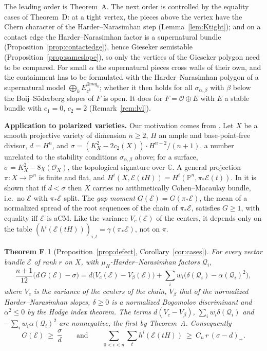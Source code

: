 \documentclass[11pt]{amsart}
\newtheorem*{theoremF}{Theorem F}
\theoremstyle{definition}
\theoremstyle{remark}
\newcommand{\PP}{\mathbb{P}}
\newcommand{\OO}{\mathcal{O}}
\newcommand{\cE}{\mathcal{E}}
\newcommand{\cQ}{\mathcal{Q}}
\begin{document}
The leading order is Theorem~A. The next order is controlled by the equality cases of Theorem~D: at a tight vertex, the pieces above the vertex have the Chern character of the Harder--Narasimhan step (Lemma~\ref{lem:Ktight}); and on a contact edge the Harder--Narasimhan factor is a supernatural bundle (Proposition~\ref{prop:contactedge}), hence Gieseker semistable (Proposition~\ref{prop:sameslope}), so only the vertices of the Gieseker polygon need to be compared. For small $\alpha$ the supernatural pieces cross walls of their own, and the containment has to be formulated with the Harder--Narasimhan polygon of a supernatural model $\bigoplus_kE_{z^k}^{\oplus mq_k}$; whether it then holds for all $\sigma_{\alpha,\beta}$ with $\beta$ below the Boij--Söderberg slopes of $F$ is open. It does for $F=\OO\oplus E$ with $E$ a stable bundle with $c_1=0$, $c_2=2$ (Remark~\ref{rem:lvl}).

\medskip\noindent\textbf{Application to polarized varieties.}
Our motivation comes from \cite{An1,An2}. Let $X$ be a smooth projective variety of dimension $n\ge2$, $H$ an ample and base-point-free divisor, $d=H^n$, and $\sigma=(K_X^2-2c_2(X))\cdot H^{n-2}/(n+1)$, a number unrelated to the stability conditions $\sigma_{\alpha,\beta}$ above; for a surface, $\sigma=K_X^2-8\chi(\OO_X)$, the topological signature over $\mathbb C$. A general projection $\pi\colon X\to\PP^n$ is finite and flat, and $H^i(X,\cE(tH))=H^i(\PP^n,\pi_*\cE(t))$. In \cite{An2} it is shown that if $d<\sigma$ then $X$ carries no arithmetically Cohen--Macaulay bundle, i.e.\ no $\cE$ with $\pi_*\cE$ split. The \emph{gap moment} $G(\cE)=G(\pi_*\cE)$, the mean of a normalized spread of the root sequences of the chain of $\pi_*\cE$, satisfies $G\ge1$, with equality iff $\cE$ is aCM. Like the variance $V_c(\cE)$ of the centers, it depends only on the table $(h^i(\cE(tH)))_{i,t}=\gamma(\pi_*\cE)$, not on $\pi$.

\begin{theoremF}[Proposition~\ref{prop:defect}, Corollary~\ref{cor:cases}]
For every vector bundle $\cE$ of rank $r$ on $X$, with $\mu_H$-Harder--Narasimhan factors $\cQ_i$,
\[
\frac{n+1}{12}\big(d\,G(\cE)-\sigma\big)=d\big(V_c(\cE)-V_\beta(\cE)\big)+\sum_iw_i\big(\delta(\cQ_i)-\alpha(\cQ_i)^2\big),
\]
where $V_c$ is the variance of the centers of the chain, $V_\beta$ that of the normalized Harder--Narasimhan slopes, $\delta\ge0$ is a normalized Bogomolov discriminant and $\alpha^2\le0$ by the Hodge index theorem. The terms $d(V_c-V_\beta)$, $\sum_iw_i\delta(\cQ_i)$ and $-\sum_iw_i\alpha(\cQ_i)^2$ are nonnegative, the first by Theorem~A. Consequently
\[
G(\cE)\ \ge\ \frac\sigma d\qquad\text{and}\qquad\sum_{0<i<n}\sum_th^i(\cE(tH))\ \ge\ C_n\,r\,(\sigma-d)_+ .
\]
\end{theoremF}
\end{document}
